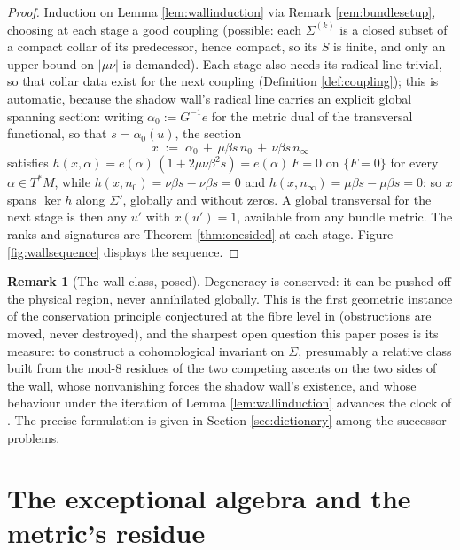 \documentclass[11pt]{article}
\theoremstyle{definition}
\newtheorem{remark}[theorem]{Remark}
\newcommand{\Sig}{\Sigma}
\newcommand{\nO}{n_0}
\newcommand{\nInf}{n_\infty}
\begin{document}
\begin{proof}
Induction on Lemma \ref{lem:wallinduction} via Remark \ref{rem:bundlesetup}, choosing at each stage a good coupling (possible: each $\Sig^{(k)}$ is a closed subset of a compact collar of its predecessor, hence compact, so its $S$ is finite, and only an upper bound on $|\mu\nu|$ is demanded). Each stage also needs its radical line trivial, so that collar data exist for the next coupling (Definition \ref{def:coupling}); this is automatic, because the shadow wall's radical line carries an explicit global spanning section: writing $\alpha_0 := G^{-1}e$ for the metric dual of the transversal functional, so that $s = \alpha_0(u)$, the section
\[
x \;:=\; \alpha_0 \,+\, \mu\beta s\, \nO \,+\, \nu\beta s\, \nInf
\]
satisfies $h(x, \alpha) = e(\alpha)\,(1 + 2\mu\nu\beta^2 s) = e(\alpha)\,F = 0$ on $\{F = 0\}$ for every $\alpha \in T^*M$, while $h(x, \nO) = \nu\beta s - \nu\beta s = 0$ and $h(x, \nInf) = \mu\beta s - \mu\beta s = 0$: so $x$ spans $\ker h$ along $\Sig'$, globally and without zeros. A global transversal for the next stage is then any $u'$ with $x(u') = 1$, available from any bundle metric. The ranks and signatures are Theorem \ref{thm:onesided} at each stage. Figure \ref{fig:wallsequence} displays the sequence.
\end{proof}

\begin{remark}[The wall class, posed]\label{rem:wallclass}
Degeneracy is conserved: it can be pushed off the physical region, never annihilated globally. This is the first geometric instance of the conservation principle conjectured at the fibre level in \cite[Conj.~7.9]{ButlerT1} (obstructions are moved, never destroyed), and the sharpest open question this paper poses is its measure: to construct a cohomological invariant on $\Sig$, presumably a relative class built from the mod-8 residues of the two competing ascents on the two sides of the wall, whose nonvanishing forces the shadow wall's existence, and whose behaviour under the iteration of Lemma \ref{lem:wallinduction} advances the clock of \cite[\S7]{ButlerT1}. The precise formulation is given in Section \ref{sec:dictionary} among the successor problems.
\end{remark}

\section{The exceptional algebra and the metric's residue}\label{sec:exceptional}
\end{document}
